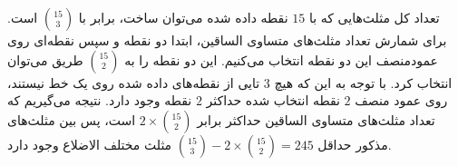 تعداد کل مثلث‌هایی که با
$15$
 نقطه داده شده می‌توان ساخت، برابر با 
 \(\binom{15}{3}\)
  است. برای شمارش تعداد مثلث‌های متساوی الساقین، ابتدا دو نقطه و سپس نقطه‌ای روی عمودمنصف این دو نقطه انتخاب می‌کنیم. 
   این دو نقطه را به 
  \(\binom{15}{2}\)
   طریق می‌توان انتخاب کرد. با توجه به این که هیچ
$3$ 
   تایی از نقطه‌های داده شده روی یک خط نیستند، روی عمود منصف 
$2$ 
   نقطه انتخاب شده حداکثر 
$2$ 
   نقطه وجود دارد. نتیجه می‌گیریم که تعداد مثلث‌های متساوی الساقین حداکثر برابر 
   \(2\times\binom{15}{2}\)
    است، پس بین مثلث‌های مذکور حداقل
    \(\binom{15}{3} - 2\times\binom{15}{2} = 245\)
     مثلث مختلف الاضلاع وجود دارد.